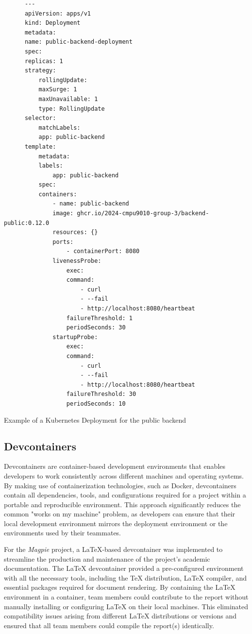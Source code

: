\documentclass[preview]{standalone}
\begin{document}
\begin{listing}[htbp]
    \begin{verbatim}
      ---
      apiVersion: apps/v1
      kind: Deployment
      metadata:
      name: public-backend-deployment
      spec:
      replicas: 1
      strategy:
          rollingUpdate:
          maxSurge: 1
          maxUnavailable: 1
          type: RollingUpdate
      selector:
          matchLabels:
          app: public-backend
      template:
          metadata:
          labels:
              app: public-backend
          spec:
          containers:
              - name: public-backend
              image: ghcr.io/2024-cmpu9010-group-3/backend-public:0.12.0
              resources: {}
              ports:
                  - containerPort: 8080
              livenessProbe:
                  exec:
                  command:
                      - curl
                      - --fail
                      - http://localhost:8080/heartbeat
                  failureThreshold: 1
                  periodSeconds: 30
              startupProbe:
                  exec:
                  command:
                      - curl
                      - --fail
                      - http://localhost:8080/heartbeat
                  failureThreshold: 30
                  periodSeconds: 10
    \end{verbatim}
    \caption{Example of a Kubernetes Deployment for the public backend}
\end{listing}

\subsection{Devcontainers}
Devcontainers are container-based development environments that enables
developers to work consistently across different machines and operating systems.
By making use of containerization technologies, such as Docker, devcontainers
contain all dependencies, tools, and configurations required for a project
within a portable and reproducible environment. This approach significantly
reduces the common "works on my machine" problem, as developers can ensure that
their local development environment mirrors the deployment environment or the
environments used by their teammates.

For the \textit{Magpie} project, a LaTeX-based devcontainer was implemented to
streamline the production and maintenance of the project's academic
documentation. The LaTeX devcontainer provided a pre-configured environment with
all the necessary tools, including the TeX distribution, LaTeX compiler, and
essential packages required for document rendering. By containing the LaTeX
environment in a container, team members could contribute to the report without
manually installing or configuring LaTeX on their local machines. This
eliminated compatibility issues arising from different LaTeX distributions or
versions and ensured that all team members could compile the report(s)
identically.
\end{document}
